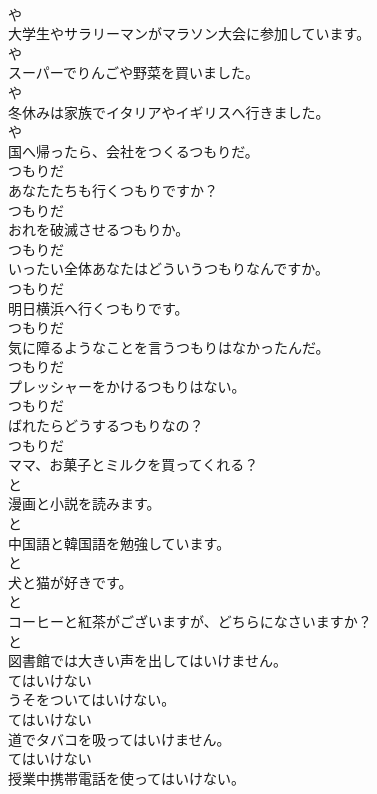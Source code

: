 \documentclass[8pt]{extreport}
\begin{document}
\begin{CJK}{UTF8}{min}
\\	や	
\\	大学生やサラリーマンがマラソン大会に参加しています。	
\\	や	
\\	スーパーでりんごや野菜を買いました。	
\\	や	
\\	冬休みは家族でイタリアやイギリスへ行きました。	
\\	や	
\\	国へ帰ったら、会社をつくるつもりだ。	
\\	つもりだ	
\\	あなたたちも行くつもりですか？	
\\	つもりだ	
\\	おれを破滅させるつもりか。	
\\	つもりだ	
\\	いったい全体あなたはどういうつもりなんですか。	
\\	つもりだ	
\\	明日横浜へ行くつもりです。	
\\	つもりだ	
\\	気に障るようなことを言うつもりはなかったんだ。	
\\	つもりだ	
\\	プレッシャーをかけるつもりはない。	
\\	つもりだ	
\\	ばれたらどうするつもりなの？	
\\	つもりだ	
\\	ママ、お菓子とミルクを買ってくれる？	
\\	と	
\\	漫画と小説を読みます。	
\\	と	
\\	中国語と韓国語を勉強しています。	
\\	と	
\\	犬と猫が好きです。	
\\	と	
\\	コーヒーと紅茶がございますが、どちらになさいますか？	
\\	と	
\\	図書館では大きい声を出してはいけません。	
\\	てはいけない	
\\	うそをついてはいけない。	
\\	てはいけない	
\\	道でタバコを吸ってはいけません。	
\\	てはいけない	
\\	授業中携帯電話を使ってはいけない。	

\end{CJK}
\end{document}
